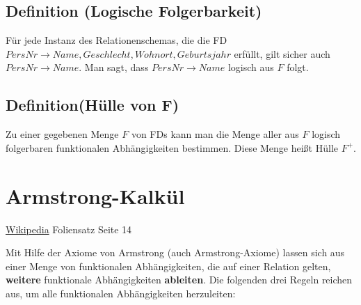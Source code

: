 \documentclass{lehramt-informatik}
\begin{document}
%

\subsection{Definition (Logische Folgerbarkeit)}

Für jede Instanz des Relationenschemas, die die FD $PersNr \rightarrow
Name, Geschlecht, Wohnort, Geburtsjahr$ erfüllt, gilt sicher auch
$PersNr \rightarrow Name$. Man sagt, dass $PersNr \rightarrow Name$
logisch aus $F$ folgt.

%

\subsection{Definition(Hülle von F)}

Zu einer gegebenen Menge $F$ von FDs kann man die Menge aller aus $F$
logisch folgerbaren funktionalen Abhängigkeiten bestimmen. Diese Menge
heißt Hülle $F^+$.

%

\section{Armstrong-Kalkül}

\href{https://de.wikipedia.org/wiki/Funktionale_Abh%C3%A4ngigkeit#Axiome_von_Armstrong}{Wikipedia}
Foliensatz Seite 14

Mit Hilfe der Axiome von Armstrong (auch Armstrong-Axiome) lassen sich
aus einer Menge von funktionalen Abhängigkeiten, die auf einer Relation
gelten, \textbf{weitere} funktionale Abhängigkeiten \textbf{ableiten}.
Die folgenden drei Regeln reichen aus, um alle funktionalen
Abhängigkeiten herzuleiten:
\end{document}
